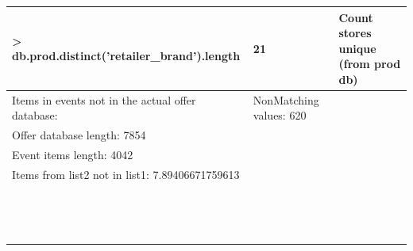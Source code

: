 \begin{table}
\begin{tabular}{l|l|l}
    > db.prod.distinct('retailer\_brand').length & 21                                                                                                                                                                                                & Count stores unique (from prod db)                                                                                                                                                                                   \\ \hline
    Items in events not in the actual offer database: &         NonMatching values:             620\\        Offer database length:          7854\\        Event items length:             4042\\        Items from list2 not in list1:  7.89406671759613 & ~                                                                                                                                                                                                                    \\ \hline
    ~                                                 & ~                                                                                                                                                                                                 & ~                                                                                                                                                                                                                    \\ \hline
    ~                                                 & ~                                                                                                                                                                                                 & ~                                                                                                                                                                                                                    \\ \hline
    ~                                                 & ~                                                                                                                                                                                                 & ~                                                                                                                                                                                                                    \\ \hline

\end{tabular}
\end{table}
